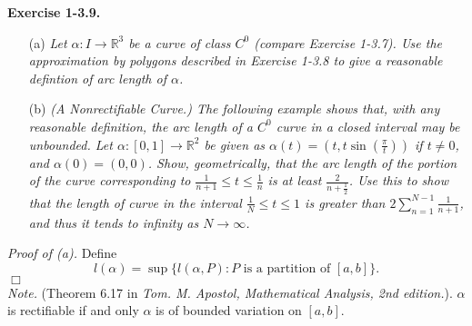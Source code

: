 \documentclass{article}
\begin{document}



\textbf{Exercise 1-3.9.}
\begin{enumerate}
  \item[(a)]
  \emph{Let $\alpha: I \to \mathbb{R}^3$ be a curve of class $C^{0}$
  (compare Exercise 1-3.7).
  Use the approximation by polygons described in Exercise 1-3.8 to give
  a reasonable defintion of arc length of $\alpha$.}
  \item[(b)]
  \emph{(A Nonrectifiable Curve.)
  The following example shows that, with any reasonable definition,
  the arc length of a $C^{0}$ curve in a closed interval may be unbounded.
  Let $\alpha:[0,1] \to \mathbb{R}^2$ be given as
  $\alpha(t) = (t, t \sin(\frac{\pi}{t}))$ if $t \neq 0$,
  and $\alpha(0) = (0,0)$.
  Show, geometrically, that the arc length of the portion of the curve corresponding to
  $\frac{1}{n+1} \leq t \leq \frac{1}{n}$ is at least $\frac{2}{n + \frac{1}{2}}$.
  Use this to show that the length of curve in the interval $\frac{1}{N} \leq t \leq 1$
  is greater than $2 \sum_{n=1}^{N-1} \frac{1}{n+1}$,
  and thus it tends to infinity as $N \to \infty$.} \\
\end{enumerate}

\emph{Proof of (a).}
Define
\[
  l(\alpha) = \sup \{ l(\alpha,P) : P \text{ is a partition of } [a,b] \}.
\]
$\Box$ \\

\emph{Note.}
(Theorem 6.17 in \emph{Tom. M. Apostol, Mathematical Analysis, 2nd edition.}).
$\alpha$ is rectifiable if and only $\alpha$ is of bounded variation on $[a,b]$. \\
\end{document}

